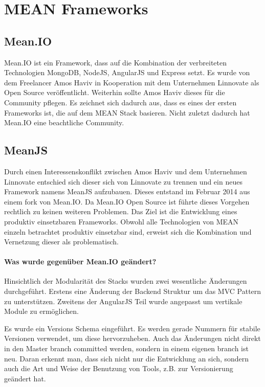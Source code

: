 \chapter{MEAN Frameworks}\label{mean-frameworks-fabian}

\section{Mean.IO}\label{mean.io}

Mean.IO ist ein Framework, dass auf die Kombination der verbreiteten
Technologien MongoDB, NodeJS, AngularJS und Express setzt. Es wurde
von dem Freelancer Amos Haviv in Kooperation mit dem Unternehmen
Linnovate als Open Source veröffentlicht. Weiterhin sollte Amos Haviv
dieses für die Community pflegen. Es zeichnet sich dadurch aus, dass es
eines der ersten Frameworks ist, die auf dem MEAN Stack basieren. Nicht
zuletzt dadurch hat Mean.IO eine beachtliche Community.

\section{MeanJS}\label{mean.js}

Durch einen Interessenskonflikt zwischen Amos Haviv und dem Unternehmen
Linnovate entschied sich dieser sich von Linnovate zu trennen und ein neues Framework namens MeanJS
aufzubauen. Dieses entstand im Februar
2014 aus einem fork von Mean.IO. Da Mean.IO Open Source ist führte dieses
Vorgehen rechtlich zu keinen weiteren Problemen. Das Ziel ist die Entwicklung eines produktiv
einsetzbaren Frameworks. Obwohl alle Technologien von MEAN einzeln
betrachtet produktiv einsetzbar sind, erweist sich die Kombination und Vernetzung
dieser als problematisch.

\subsubsection{Was wurde gegenüber Mean.IO geändert?}

Hinsichtlich der Modularität des Stacks wurden zwei wesentliche Änderungen durchgeführt. Erstens eine Änderung der Backend Struktur um das MVC Pattern zu unterstützen. Zweitens der AngularJS Teil wurde angepasst um vertikale Module zu ermöglichen.

Es wurde ein Versions Schema eingeführt. Es werden gerade Nummern für stabile Versionen verwendet, um diese hervorzuheben. Auch das Änderungen nicht direkt in den Master branch committed werden, sondern in einem eigenen branch ist neu. Daran erkennt man, dass sich nicht nur die Entwicklung an sich, sondern auch die Art und Weise der Benutzung von Tools, z.B. zur Versionierung geändert hat.


